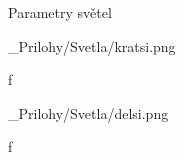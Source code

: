  Parametry světel

\medskip
\picw=15cm _Prilohy/Svetla/kratsi.png
\caption/f
\medskip

\medskip
\picw=15cm _Prilohy/Svetla/delsi.png
\caption/f
\medskip

\par
